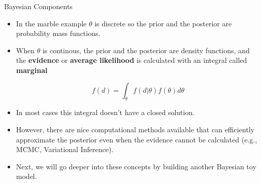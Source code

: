 \documentclass[handout]{beamer}
\begin{document}
\begin{frame}{Bayesian Components}
\scriptsize{
\begin{itemize}

\item In the marble example $\theta$ is discrete so the prior and the posterior are probability mass functions.

\item When $\theta$ is continous, the prior and the posterior are density functions, and the \textbf{evidence} or \textbf{average likelihood} is calculated with an integral called \textbf{marginal}

\begin{equation}
 f(d) = \int_{\theta}f(d|\theta)f(\theta)d\theta  
\end{equation}

\item In most cases this integral doesn't have a closed solution.

\item However, there are nice computational methods available that can efficiently approximate the posterior even when the evidence cannot be calculated (e.g., MCMC, Variational Inference). 

\item Next, we will go deeper into these concepts by building another Bayesian toy model.
 
\end{itemize}
 } 

\end{frame}
\end{document}
